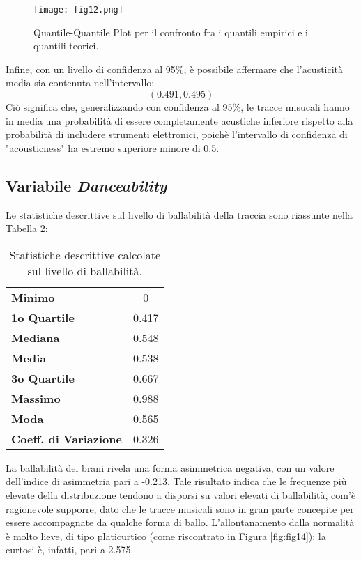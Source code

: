 \documentclass[fleqn,10pt]{SelfArx} %
\begin{document}
\begin{figure}[H]
    \centering
    \texttt{[image: fig12.png]}
    \label{fig:fig12}
    \caption{Quantile-Quantile Plot per il confronto fra i quantili empirici e i quantili teorici.}
\end{figure}
Infine, con un livello di confidenza al 95\%, è possibile affermare che l'acusticità media sia contenuta nell'intervallo:
\begin{equation}
    (0.491, 0.495)
\end{equation}
Ciò significa che, generalizzando con confidenza al 95\%, le tracce misucali hanno in media una probabilità di essere completamente acustiche inferiore rispetto alla probabilità di includere strumenti elettronici, poichè l'intervallo di confidenza di "acousticness" ha estremo superiore minore di 0.5. 
\subsection*{Variabile \textit{Danceability}}
Le statistiche descrittive sul livello di ballabilità della traccia sono riassunte nella Tabella 2:
{\begin{table}[H]
\centering

\begin{tabular}[t]{lc}
\toprule
\midrule
\textbf{Minimo}&0\\
\textbf{1o Quartile}&0.417\\
\textbf{Mediana}&0.548\\
\textbf{Media}&0.538\\
\textbf{3o Quartile}&0.667\\
\textbf{Massimo}&0.988\\
\textbf{Moda}&0.565\\
\textbf{Coeff. di Variazione}&0.326\\
\bottomrule
\end{tabular}
\caption{Statistiche descrittive calcolate sul livello di ballabilità.}
\end{table}}
La ballabilità dei brani rivela una forma asimmetrica negativa, con un valore dell'indice di asimmetria pari a -0.213. Tale risultato indica che le frequenze più elevate della distribuzione tendono a disporsi su valori elevati di ballabilità, com'è ragionevole supporre, dato che le tracce musicali sono in gran parte concepite per essere accompagnate da qualche forma di ballo. L'allontanamento dalla normalità è molto lieve, di tipo platicurtico (come riscontrato in Figura \ref{fig:fig14}): la curtosi è, infatti, pari a 2.575.\\
\end{document}
